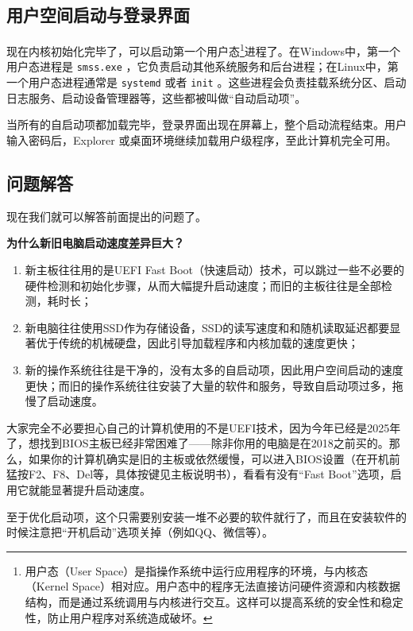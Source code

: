 \subsection{用户空间启动与登录界面}

现在内核初始化完毕了，可以启动第一个用户态\footnote{用户态（User Space）是指操作系统中运行应用程序的环境，与内核态（Kernel Space）相对应。用户态中的程序无法直接访问硬件资源和内核数据结构，而是通过系统调用与内核进行交互。这样可以提高系统的安全性和稳定性，防止用户程序对系统造成破坏。}进程了。在Windows中，第一个用户态进程是 \texttt{smss.exe} ，它负责启动其他系统服务和后台进程；在Linux中，第一个用户态进程通常是 \texttt{systemd} 或者 \texttt{init} 。这些进程会负责挂载系统分区、启动日志服务、启动设备管理器等，这些都被叫做“自动启动项”。

当所有的自启动项都加载完毕，登录界面出现在屏幕上，整个启动流程结束。用户输入密码后，Explorer 或桌面环境继续加载用户级程序，至此计算机完全可用。

\subsection{问题解答}

现在我们就可以解答前面提出的问题了。

\textbf{为什么新旧电脑启动速度差异巨大？}

\begin{enumerate}
  \item 新主板往往用的是UEFI Fast Boot（快速启动）技术，可以跳过一些不必要的硬件检测和初始化步骤，从而大幅提升启动速度；而旧的主板往往是全部检测，耗时长；
  \item 新电脑往往使用SSD作为存储设备，SSD的读写速度和和随机读取延迟都要显著优于传统的机械硬盘，因此引导加载程序和内核加载的速度更快；
  \item 新的操作系统往往是干净的，没有太多的自启动项，因此用户空间启动的速度更快；而旧的操作系统往往安装了大量的软件和服务，导致自启动项过多，拖慢了启动速度。
\end{enumerate}

大家完全不必要担心自己的计算机使用的不是UEFI技术，因为今年已经是2025年了，想找到BIOS主板已经非常困难了——除非你用的电脑是在2018之前买的。那么，如果你的计算机确实是旧的主板或依然缓慢，可以进入BIOS设置（在开机前猛按F2、F8、Del等，具体按键见主板说明书），看看有没有“Fast Boot”选项，启用它就能显著提升启动速度。

至于优化启动项，这个只需要别安装一堆不必要的软件就行了，而且在安装软件的时候注意把“开机启动”选项关掉（例如QQ、微信等）。


